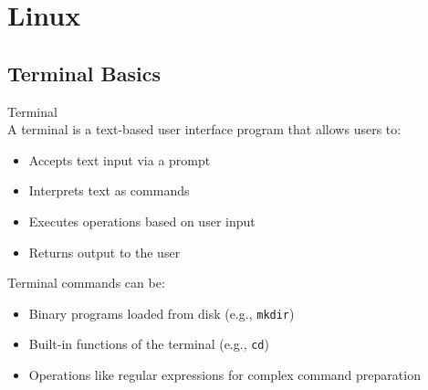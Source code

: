 \section{Linux}

\subsection{Terminal Basics}


\begin{definition}{Terminal}\\
    A terminal is a text-based user interface program that allows users to:
    \begin{itemize}
        \item Accepts text input via a prompt
        \item Interprets text as commands
        \item Executes operations based on user input
        \item Returns output to the user
    \end{itemize}
    \vspace{2mm}
    Terminal commands can be:
    \begin{itemize}
        \item Binary programs loaded from disk (e.g., \texttt{mkdir})
        \item Built-in functions of the terminal (e.g., \texttt{cd})
        \item Operations like regular expressions for complex command preparation
    \end{itemize}
\end{definition}

